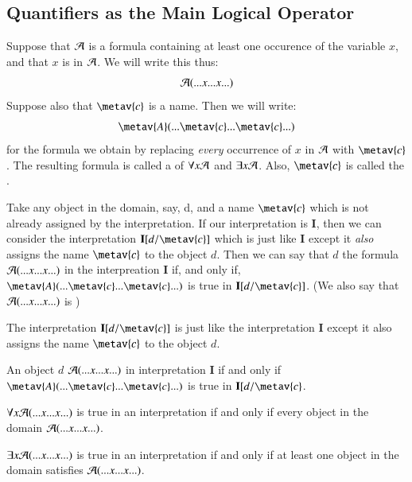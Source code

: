 \documentclass[12pt, a4paper, oneside, openright, titlepage]{book}
\begin{document}
\subsection{\textsection Quantifiers as the Main Logical Operator}

\begin{defn}
    Suppose that $\mathcal{A}$ is a formula containing at least one occurence of the variable $x$, and that $x$ is  in $\mathcal{A}$. We will write this thus:\begin{equation*}
        \mathcal{A}(...x...x...)
    \end{equation*}
    Suppose also that $\metav{c}$ is a name. Then we will write:\begin{equation*}
        \metav{A}(...\metav{c}...\metav{c}...)
    \end{equation*}
    for the formula we obtain by replacing \emph{every} occurrence of $x$ in $\mathcal{A}$ with $\metav{c}$. The resulting formula is called a  of $\forall x\mathcal{A}$ and $\exists x\mathcal{A}$. Also, $\metav{c}$ is called the .
\end{defn}


\begin{defn}
    Take any object in the domain, say, d, and a name $\metav{c}$ which is not already assigned by the interpretation. If our interpretation is $\mathbf{I}$, then we can consider the interpretation $\mathbf{I}[d/\metav{c}]$ which is just like $\mathbf{I}$ except it \emph{also} assigns the name $\metav{c}$ to the object $d$. Then we can say that $d$  the formula $\mathcal{A}(...x...x...)$ in the interpreation $\mathbf{I}$ if, and only if, $\metav{A}(...\metav{c}...\metav{c}...)$ is true in $\mathbf{I}[d/\metav{c}]$. (We also say that $\mathcal{A}(...x...x...)$ is )
\end{defn}


\begin{defn}
    The interpretation $\mathbf{I}[d/\metav{c}]$ is just like the interpretation $\mathbf{I}$ except it also assigns the name $\metav{c}$ to the object $d$.


    An object $d$  $\mathcal{A}(...x...x...)$ in interpretation $\mathbf{I}$ if and only if $\metav{A}(...\metav{c}...\metav{c}...)$ is true in $\mathbf{I}[d/\metav{c}$.
\end{defn}

\begin{defn}
    $\forall x\mathcal{A}(...x...x...)$ is true in an interpretation if and only if every object in the domain  $\mathcal{A}(...x...x...)$.


    $\exists x \mathcal{A}(...x...x...)$ is true in an interpretation if and only if at least one object in the domain satisfies $\mathcal{A}(...x...x...)$.
\end{defn}
\end{document}
